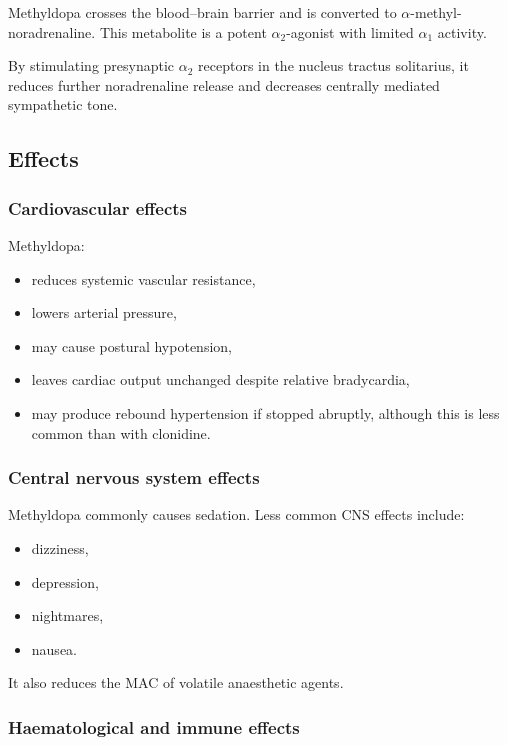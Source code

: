 \documentclass[11pt,a4paper]{article}
\begin{document}
Methyldopa crosses the blood--brain barrier and is converted to $\alpha$-methyl-noradrenaline. This metabolite is a potent $\alpha_2$-agonist with limited $\alpha_1$ activity.

By stimulating presynaptic $\alpha_2$ receptors in the nucleus tractus solitarius, it reduces further noradrenaline release and decreases centrally mediated sympathetic tone.

\subsection{Effects}

\subsubsection{Cardiovascular effects}

Methyldopa:
\begin{itemize}
    \item reduces systemic vascular resistance,
    \item lowers arterial pressure,
    \item may cause postural hypotension,
    \item leaves cardiac output unchanged despite relative bradycardia,
    \item may produce rebound hypertension if stopped abruptly, although this is less common than with clonidine.
\end{itemize}

\subsubsection{Central nervous system effects}

Methyldopa commonly causes sedation. Less common CNS effects include:
\begin{itemize}
    \item dizziness,
    \item depression,
    \item nightmares,
    \item nausea.
\end{itemize}

It also reduces the MAC of volatile anaesthetic agents.

\subsubsection{Haematological and immune effects}
\end{document}
